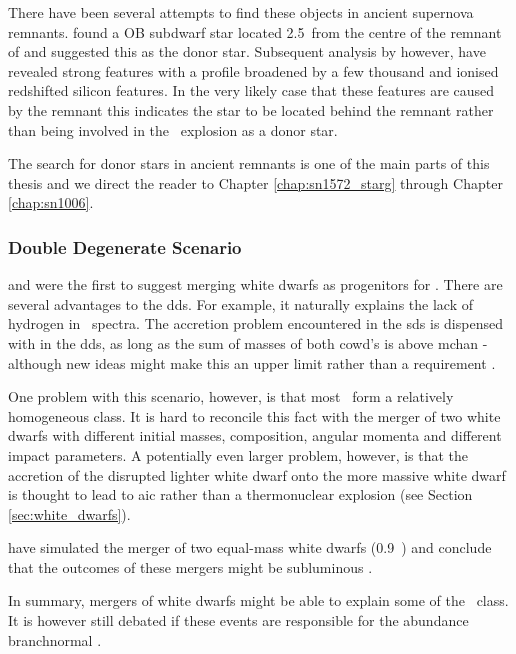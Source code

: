 There have been several attempts to find these objects in ancient supernova remnants. \citet{1980ApJ...241.1039S} found a OB subdwarf star located 2.5\arcmin\ from the centre of the remnant of  and suggested this as the donor star. Subsequent analysis by \cite{1997ApJ...477L..53W, 1983ApJ...269L...5W} however, have revealed strong  features with a profile broadened by a few thousand \kms and ionised redshifted silicon features. In the very likely case that these features are caused by the remnant this indicates the star to be located behind the remnant rather than being involved in the \snia\ explosion as a donor star.
 
The search for donor stars in ancient remnants is one of the main parts of this thesis and we direct the reader to Chapter \ref{chap:sn1572_starg} through Chapter \ref{chap:sn1006}.



\subsubsection{Double Degenerate Scenario}
\citet{1984ApJ...277..355W} and \citet{1984ApJS...54..335I} were the first to suggest merging white dwarfs as progenitors for \snia. There are several advantages to the \gls{dds}. For example, it naturally explains the lack of hydrogen in \snia\ spectra. The accretion problem encountered in the \gls{sds} is dispensed with in the \gls{dds}, as long as the sum of masses of both \gls{cowd}'s is above \gls{mchan} - although new ideas might make this an upper limit rather than a requirement \citep{2010ApJ...722L.157V}. 

One problem with this scenario, however, is that most \snia\ form a relatively homogeneous class. It is hard to reconcile this fact with the merger of two white dwarfs with different initial masses, composition, angular momenta and different impact parameters. A potentially even larger problem, however, is that the accretion of the disrupted lighter white dwarf onto the more massive white dwarf is thought to lead to \gls{aic} rather than a thermonuclear explosion (see Section \ref{sec:white_dwarfs}).

\cite{2010Natur.463...61P} have simulated the merger of two equal-mass white dwarfs (0.9~\msun) and conclude that the outcomes of these mergers might be subluminous \sneia.

In summary, mergers of white dwarfs might be able to explain some of the \snia\ class. It is however still debated if these events are responsible for the abundance \gls{branchnormal} \sneia. 

